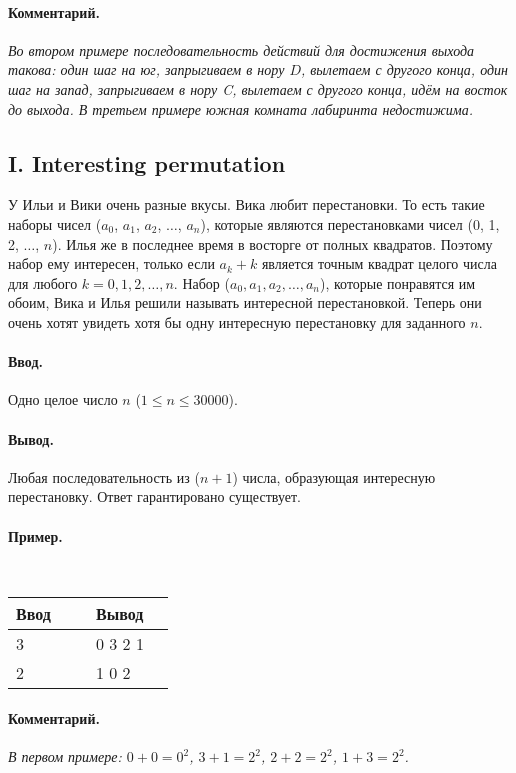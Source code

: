\documentclass[10pt, a5paper]{article}
\newcommand{\informat}[1]
{
	\paragraph{Ввод.\\} #1
}
\newcommand{\outformat}[1]
{
	\paragraph{Вывод.\\} #1
}
\newcommand{\examplee}[4]
{
	\paragraph{Пример.\\}
	{\tt
	\begin{tabular}{|p{0.4\linewidth}|p{0.4\linewidth}|}
	\hline
	Ввод 	& Вывод  	\\
	\hline
	#1 		& #2 		\\
	\hline
	#3		& #4		\\
	\hline
	\end{tabular}
	}
}
\newcommand{\excomm}[1]
{
	\paragraph{Комментарий. \\}
	\textit{#1}
}
\begin{document}
\excomm{Во втором примере последовательность действий для достижения выхода такова: один шаг на юг, запрыгиваем в нору $D$, вылетаем с другого конца, один шаг на запад, запрыгиваем в нору C, вылетаем с другого конца, идём на восток до выхода. В третьем примере южная комната лабиринта недостижима.}



\subsection*{I. Interesting permutation}

У Ильи и Вики очень разные вкусы. Вика любит перестановки. То есть такие наборы чисел ($a_0$, $a_1$, $a_2$, $\dots$, $a_n$), которые являются перестановками чисел (0, 1, 2, $\dots$, $n$). Илья же в последнее время в восторге от полных квадратов. Поэтому набор ему интересен, только если $a_k+k$ является точным квадрат целого числа для любого $k = 0, 1, 2, \dots, n$. Набор ($a_0, a_1, a_2, \dots, a_n$), которые понравятся им обоим, Вика и Илья решили называть интересной перестановкой. Теперь они очень хотят увидеть хотя бы одну интересную перестановку для заданного $n$.

\informat{Одно целое число $n$ ($1 \le n \le 30000$).}

\outformat{Любая последовательность из ($n+1$) числа, образующая интересную перестановку. Ответ гарантировано существует.}

\examplee{3}{0 3 2 1}{2}{1 0 2}

\excomm{В первом примере: $0 + 0 = 0^2$, $3 + 1 = 2^2$, $2 + 2 = 2^2$, $1 + 3 = 2^2$.}
\end{document}
